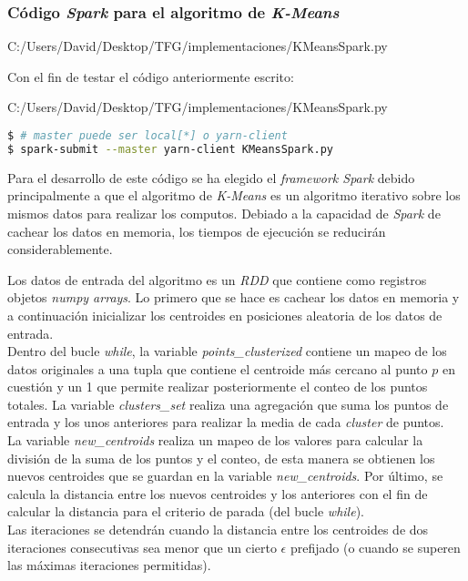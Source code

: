 \newpage

\subsubsection*{Código \textit{Spark} para el algoritmo de \textit{K-Means}}


                {C:/Users/David/Desktop/TFG/implementaciones/KMeansSpark.py}

\clearpage
Con el fin de testar el código anteriormente escrito:


                {C:/Users/David/Desktop/TFG/implementaciones/KMeansSpark.py}

\begin{lstlisting}[language=bash, numbers=none]
$ # master puede ser local[*] o yarn-client
$ spark-submit --master yarn-client KMeansSpark.py
\end{lstlisting}

Para el desarrollo de este código se ha elegido el \textit{framework Spark} debido principalmente a que el algoritmo
de \textit{K-Means} es un algoritmo iterativo sobre los mismos datos para realizar los computos. Debiado a la capacidad
de \textit{Spark} de cachear los datos en memoria, los tiempos de ejecución se reducirán considerablemente.
\newline

Los datos de entrada del algoritmo es un \textit{RDD} que contiene como registros objetos \textit{numpy arrays}.
Lo primero que se hace es cachear los datos en memoria y a continuación inicializar los centroides en posiciones
aleatoria de los datos de entrada.\\
Dentro del bucle \textit{while}, la variable \textit{points\_clusterized} contiene un mapeo de los datos originales
a una tupla que contiene el centroide más cercano al punto $p$ en cuestión y un 1 que permite realizar posteriormente
el conteo de los puntos totales. La variable \textit{clusters\_set} realiza una agregación que suma los puntos de
entrada y los unos anteriores para realizar la media de cada \textit{cluster} de puntos.\\
La variable \textit{new\_centroids} realiza un mapeo de los valores para calcular la división 
de la suma de los puntos y el conteo, de esta manera se obtienen los nuevos centroides que se guardan en la variable
\textit{new\_centroids}. Por último, se calcula la distancia entre los nuevos centroides y los anteriores con el fin
de calcular la distancia para el criterio de parada (del bucle \textit{while}).\\
Las iteraciones se detendrán cuando la distancia entre los centroides de dos iteraciones consecutivas sea menor
que un cierto $\epsilon$ prefijado (o cuando se superen las máximas iteraciones permitidas).
\newline

